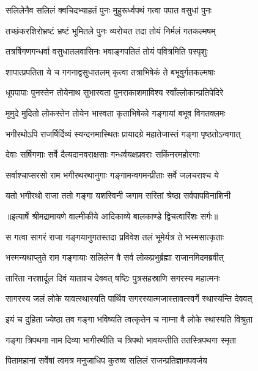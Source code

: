 \twolineshloka
{सलिलेनैव सलिलं क्वचिदभ्याहतं पुनः}
{मुहुरूर्ध्वपथं गत्वा पपात वसुधां पुनः} %

\twolineshloka
{तच्छंकरशिरोभ्रष्टं भ्रष्टं भूमितले पुनः}
{व्यरोचत तदा तोयं निर्मलं गतकल्मषम्} %

\twolineshloka
{तत्रर्षिगणगन्धर्वा वसुधातलवासिनः}
{भवाङ्गपतितं तोयं पवित्रमिति पस्पृशुः} %

\twolineshloka
{शापात्प्रपतिता ये च गगनाद्वसुधातलम्}
{कृत्वा तत्राभिषेकं ते बभूवुर्गतकल्मषाः} %

\twolineshloka
{धूपपापाः पुनस्तेन तोयेनाथ सुभास्वता}
{पुनराकाशमाविश्य स्वाँल्लोकान्प्रतिपेदिरे} %

\twolineshloka
{मुमुदे मुदितो लोकस्तेन तोयेन भास्वता}
{कृताभिषेको गङ्गायां बभूव विगतक्लमः} %

\twolineshloka
{भगीरथोऽपि राजर्षिर्दिव्यं स्यन्दनमास्थितः}
{प्रायादग्रे महातेजास्तं गङ्गा पृष्ठतोऽन्वगात्} %

\twolineshloka
{देवाः सर्षिगणाः सर्वे दैत्यदानवराक्षसाः}
{गन्धर्वयक्षप्रवराः सकिंनरमहोरगाः} %

\twolineshloka
{सर्वाश्चाप्सरसो राम भगीरथरथानुगाः}
{गङ्गामन्वगमन्प्रीताः सर्वे जलचराश्च ये} %

\twolineshloka
{यतो भगीरथो राजा ततो गङ्गा यशस्विनी}
{जगाम सरितां श्रेष्ठा सर्वपापविनाशिनी} %


{॥इत्यार्षे श्रीमद्रामायणे वाल्मीकीये आदिकाव्ये बालकाण्डे द्विचत्वारिंशः सर्गः॥}


\twolineshloka
{स गत्वा सागरं राजा गङ्गयानुगतस्तदा}
{प्रविवेश तलं भूमेर्यत्र ते भस्मसात्कृताः} %

\twolineshloka
{भस्मन्यथाप्लुते राम गङ्गायाः सलिलेन वै}
{सर्व लोकप्रभुर्ब्रह्मा राजानमिदमब्रवीत्} %

\twolineshloka
{तारिता नरशार्दूल दिवं याताश्च देववत्}
{षष्टिः पुत्रसहस्राणि सगरस्य महात्मनः} %

\twolineshloka
{सागरस्य जलं लोके यावत्स्थास्यति पार्थिव}
{सगरस्यात्मजास्तावत्स्वर्गे स्थास्यन्ति देववत्} %

\twolineshloka
{इयं च दुहिता ज्येष्ठा तव गङ्गा भविष्यति}
{त्वत्कृतेन च नाम्ना वै लोके स्थास्यति विश्रुता} %

\twolineshloka
{गङ्गा त्रिपथगा नाम दिव्या भागीरथीति च}
{त्रिपथो भावयन्तीति ततस्त्रिपथगा स्मृता} %

\twolineshloka
{पितामहानां सर्वेषां त्वमत्र मनुजाधिप}
{कुरुष्व सलिलं राजन्प्रतिज्ञामपवर्जय} %

